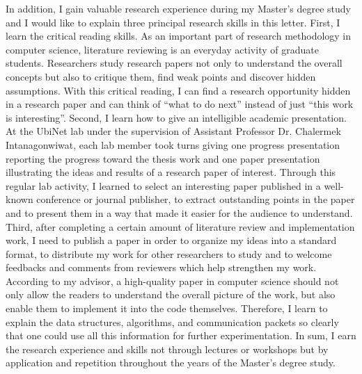 \documentclass[a4paper,10pt]{report}
\begin{document}
\vspace{0.2cm}
In addition, I gain valuable research experience during my Master's degree study and I would like to explain three principal research skills in this letter. First, I learn the critical reading skills. As an important part of research methodology in computer science, literature reviewing is an everyday activity of graduate students. Researchers study research papers not only to understand the overall concepts but also to critique them, find weak points and discover hidden assumptions. With this critical reading, I can find a research opportunity hidden in a research paper and can think of ``what to do next'' instead of just ``this work is interesting''. Second, I learn how to give an intelligible academic presentation. At the UbiNet lab under the supervision of Assistant Professor Dr. Chalermek Intanagonwiwat, each lab member took turns giving one progress presentation reporting the progress toward the thesis work and one paper presentation illustrating the ideas and results of a research paper of interest. Through this regular lab activity, I learned to select an interesting paper published in a well-known conference or journal publisher, to extract outstanding points in the paper and to present them in a way that made it easier for the audience to understand. Third, after completing a certain amount of literature review and implementation work, I need to publish a paper in order to organize my ideas into a standard format, to distribute my work for other researchers to study and to welcome feedbacks and comments from reviewers which help strengthen my work. According to my advisor, a high-quality paper in computer science should not only allow the readers to understand the overall picture of the work, but also enable them to implement it into the code themselves. Therefore, I learn to explain the data structures, algorithms, and communication packets so clearly that one could use all this information for further experimentation. In sum, I earn the research experience and skills not through lectures or workshops but by application and repetition throughout the years of the Master's degree study.
\end{document}
